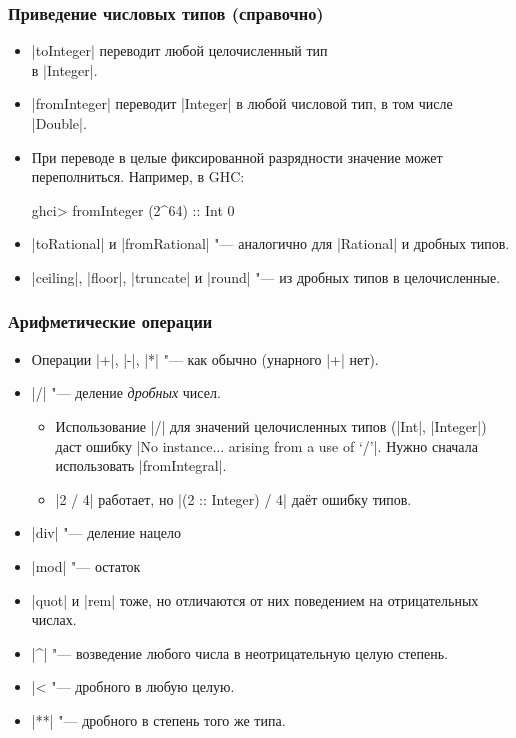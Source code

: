 \documentclass[10pt]{beamer}
\begin{document}
\begin{frame}[fragile]
  \frametitle{Приведение числовых типов (справочно)}
  \begin{itemize}
    \item \haskinline|toInteger| переводит любой целочисленный тип \\в \haskinline|Integer|.
    \item \haskinline|fromInteger| переводит \haskinline|Integer| в любой числовой тип, в том числе \haskinline|Double|.
    \item При переводе в целые фиксированной разрядности значение может переполниться. Например, в GHC:
          \begin{haskell}
            ghci> fromInteger (2^64) :: Int
            0
          \end{haskell}
    \item \haskinline|toRational| и \haskinline|fromRational| "--- аналогично для \haskinline|Rational| и дробных типов.
    \item \haskinline|ceiling|, \haskinline|floor|, \haskinline|truncate| и \haskinline|round| "--- из дробных типов в целочисленные.
  \end{itemize}
\end{frame}

\begin{frame}[fragile]
  \frametitle{Арифметические операции}
  \begin{itemize}
    \item Операции \haskinline|+|, \haskinline|-|, \haskinline|*| "--- как обычно (унарного \haskinline|+| нет).
    \item \haskinline|/| "--- деление \emph{дробных} чисел.
          \begin{itemize}
            \item Использование \haskinline|/| для значений целочисленных типов (\haskinline|Int|, \haskinline|Integer|) даст ошибку \ghcinline|No instance... arising from a use of ‘/’|. Нужно сначала использовать \haskinline|fromIntegral|.
            \item \haskinline|2 / 4| работает, но \haskinline|(2 :: Integer) / 4| даёт ошибку типов.
          \end{itemize}
    \item \haskinline|div| "--- деление нацело
    \item \haskinline|mod| "--- остаток
    \item
          \haskinline|quot| и \haskinline|rem| тоже, но отличаются от них поведением на отрицательных числах.
    \item \haskinline|^| "--- возведение любого числа в неотрицательную  целую степень.
    \item \haskinline|^^| "--- дробного в любую целую.
    \item \haskinline|**| "--- дробного в степень того же типа.
  \end{itemize}
\end{frame}
\end{document}
